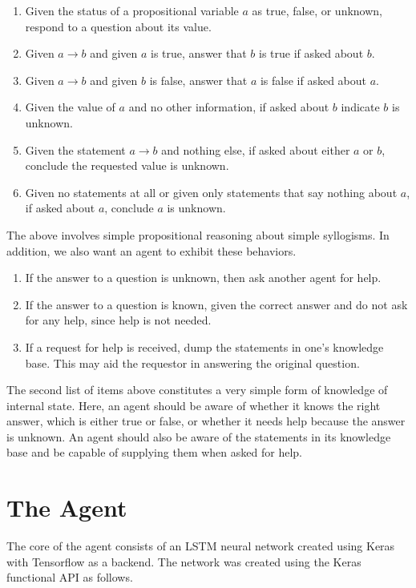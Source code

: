 \documentclass{article}
\begin{document}
\begin{enumerate}
\item Given the status of a propositional variable $a$ as
true, false, or unknown, respond to a question about its value.
\item Given $a \rightarrow b$ and given $a$ is true, answer
that $b$ is true if asked about $b$.
\item Given $a \rightarrow b$ and given $b$ is false, answer that
$a$ is false if asked about $a$.
\item Given the value of $a$ and no other information, if asked about
$b$ indicate $b$ is unknown.
\item Given the statement $a \rightarrow b$ and nothing else, if asked
about either $a$ or $b$, conclude the requested value is unknown.
\item Given no statements at all or given only statements
that say nothing about $a$, if asked about $a$, conclude $a$ is
unknown.
\end{enumerate}

The above involves simple propositional reasoning about simple syllogisms.
In addition, we also want an agent to exhibit these behaviors.

\begin{enumerate}
\item If the answer to a question is unknown, then ask another agent for
help.
\item If the answer to a question is known, given the correct answer and
do not ask for any help, since help is not needed.
\item If a request for help is received, dump the statements in one's
knowledge base.  This may aid the requestor in answering the
original question.
\end{enumerate}

The second list of items above constitutes a very simple form of knowledge
of internal state. Here, an agent should be aware of whether it knows the
right answer, which is either true or false, or whether it needs help
because the answer
is unknown.  An agent should also be aware of the statements in its
knowledge base and be capable of supplying them when asked for help.

\section{The Agent}
\label{the_agent}
The core of the agent consists of an LSTM neural network created
using Keras \cite{chollet2015keras}
with Tensorflow \cite{tensorflow2015-whitepaper}
as a backend.  The network was created using
the Keras functional API as follows.
\end{document}
